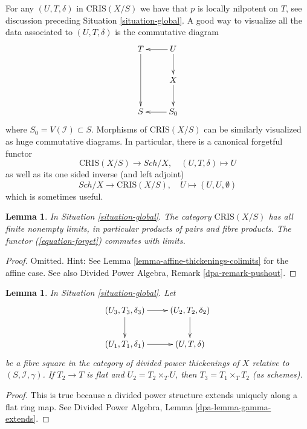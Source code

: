 \documentclass{stacks-project}
\theoremstyle{plain}
\newtheorem{lemma}[subsection]{Lemma}
\theoremstyle{definition}
\theoremstyle{remark}
\numberwithin{equation}{subsection}
\def\Sch{\mathit{Sch}}
\begin{document}
\noindent
For any $(U, T, \delta)$ in $\text{CRIS}(X/S)$
we have that $p$ is locally nilpotent on $T$, see discussion preceding
Situation \ref{situation-global}.
A good way to visualize all the data associated to $(U, T, \delta)$
is the commutative diagram
$$
\xymatrix{
T \ar[dd] & U \ar[l] \ar[d] \\
& X \ar[d] \\
S & S_0 \ar[l]
}
$$
where $S_0 = V(\mathcal{I}) \subset S$. Morphisms of $\text{CRIS}(X/S)$
can be similarly visualized as huge commutative diagrams. In particular,
there is a canonical forgetful functor
\begin{equation}
\label{equation-forget}
\text{CRIS}(X/S) \longrightarrow \Sch/X,\quad
(U, T, \delta) \longmapsto U
\end{equation}
as well as its one sided inverse (and left adjoint)
\begin{equation}
\label{equation-endow-trivial}
\Sch/X \longrightarrow \text{CRIS}(X/S),\quad
U \longmapsto (U, U, \emptyset)
\end{equation}
which is sometimes useful.

\begin{lemma}
\label{lemma-divided-power-thickening-fibre-products}
In Situation \ref{situation-global}.
The category $\text{CRIS}(X/S)$ has all finite nonempty limits,
in particular products of pairs and fibre products.
The functor (\ref{equation-forget}) commutes with limits.
\end{lemma}

\begin{proof}
Omitted. Hint: See Lemma \ref{lemma-affine-thickenings-colimits}
for the affine case. See also
Divided Power Algebra, Remark \ref{dpa-remark-pushout}.
\end{proof}

\begin{lemma}
\label{lemma-divided-power-thickening-base-change-flat}
In Situation \ref{situation-global}. Let
$$
\xymatrix{
(U_3, T_3, \delta_3) \ar[d] \ar[r] & (U_2, T_2, \delta_2) \ar[d] \\
(U_1, T_1, \delta_1) \ar[r] & (U, T, \delta)
}
$$
be a fibre square in the category of divided power thickenings of
$X$ relative to $(S, \mathcal{I}, \gamma)$. If $T_2 \to T$ is
flat and $U_2 = T_2 \times_T U$, then $T_3 = T_1 \times_T T_2$ (as schemes).
\end{lemma}

\begin{proof}
This is true because a divided power structure extends uniquely
along a flat ring map. See
Divided Power Algebra, Lemma \ref{dpa-lemma-gamma-extends}.
\end{proof}
\end{document}
